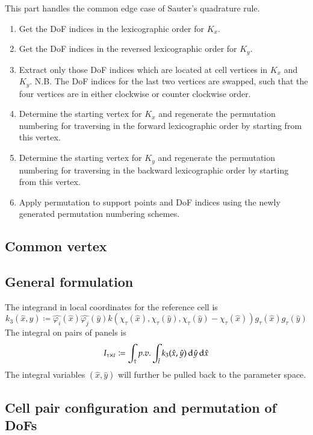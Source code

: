 \documentclass[11pt, a4paper]{article}
\begin{document}
This part handles the common edge case of Sauter's quadrature rule.
\begin{enumerate}
\item Get the DoF indices in the lexicographic order for $K_x$.
\item Get the DoF indices in the reversed lexicographic order for $K_y$.
\item Extract only those DoF indices which are located at cell vertices in $K_x$ and $K_y$.
  N.B. The DoF indices for the last two vertices are swapped, such that the four vertices are in
  either clockwise or counter clockwise order.
\item Determine the starting vertex for $K_x$ and regenerate the permutation numbering for
  traversing in the forward lexicographic order by starting from this vertex.
\item Determine the starting vertex for $K_y$ and regenerate the permutation numbering for
  traversing in the backward lexicographic order by starting from this vertex.
\item Apply permutation to support points and DoF indices using the newly generated permutation
  numbering schemes.
\end{enumerate}


\subsection{Common vertex}

\subsection{General formulation}

The integrand in local coordinates for the reference cell is
\begin{equation}
  k_3(\hat{x}, \hat{y}) \coloneqq \hat{\varphi_i}(\hat{x})\hat{\varphi_j}(\hat{y})
  k(\chi_{\tau}(\hat{x}), \chi_{\tau}(\hat{y}), \chi_{\tau}(\hat{y}) 
  - \chi_{\tau}(\hat{x})) g_{\tau}(\hat{x}) g_{\tau}(\hat{y})
\end{equation}
The integral on pairs of panels is
\begin{equation}
  I_{\tau\times t} \coloneqq \int_{\hat{\tau}} p.v. \int_{\hat{t}} k_3(\hat{x},\hat{y}) \,\mathrm{d}
  \hat{y} \,\mathrm{d} \hat{x}
\end{equation}
The integral variables $(\hat{x}, \hat{y})$ will further be pulled back to the parameter space.

\subsection{Cell pair configuration and permutation of DoFs}
\end{document}
